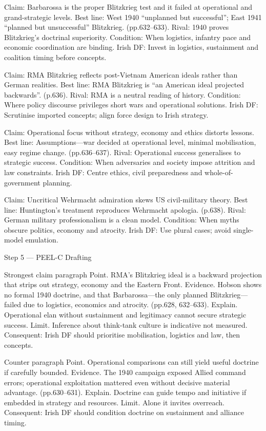 Claim: Barbarossa is the proper Blitzkrieg test and it failed at operational and grand-strategic levels.
Best line: West 1940 “unplanned but successful”; East 1941 “planned but unsuccessful” Blitzkrieg. (pp.632–633).
Rival: 1940 proves Blitzkrieg’s doctrinal superiority.
Condition: When logistics, infantry pace and economic coordination are binding.
Irish DF: Invest in logistics, sustainment and coalition timing before concepts.

Claim: RMA Blitzkrieg reflects post-Vietnam American ideals rather than German realities.
Best line: RMA Blitzkrieg is “an American ideal projected backwards”. (p.636).
Rival: RMA is a neutral reading of history.
Condition: Where policy discourse privileges short wars and operational solutions.
Irish DF: Scrutinise imported concepts; align force design to Irish strategy.

Claim: Operational focus without strategy, economy and ethics distorts lessons.
Best line: Assumptions—war decided at operational level, minimal mobilisation, easy regime change. (pp.636–637).
Rival: Operational success generalises to strategic success.
Condition: When adversaries and society impose attrition and law constraints.
Irish DF: Centre ethics, civil preparedness and whole-of-government planning.

Claim: Uncritical Wehrmacht admiration skews US civil-military theory.
Best line: Huntington’s treatment reproduces Wehrmacht apologia. (p.638).
Rival: German military professionalism is a clean model.
Condition: When myths obscure politics, economy and atrocity.
Irish DF: Use plural cases; avoid single-model emulation.

Step 5 — PEEL-C Drafting

Strongest claim paragraph
Point. RMA’s Blitzkrieg ideal is a backward projection that strips out strategy, economy and the Eastern Front.
Evidence. Hobson shows no formal 1940 doctrine, and that Barbarossa—the only planned Blitzkrieg—failed due to logistics, economics and atrocity. (pp.628, 632–633).
Explain. Operational elan without sustainment and legitimacy cannot secure strategic success.
Limit. Inference about think-tank culture is indicative not measured. Consequent: Irish DF should prioritise mobilisation, logistics and law, then concepts.

Counter paragraph
Point. Operational comparisons can still yield useful doctrine if carefully bounded.
Evidence. The 1940 campaign exposed Allied command errors; operational exploitation mattered even without decisive material advantage. (pp.630–631).
Explain. Doctrine can guide tempo and initiative if embedded in strategy and resources.
Limit. Alone it invites overreach. Consequent: Irish DF should condition doctrine on sustainment and alliance timing.

